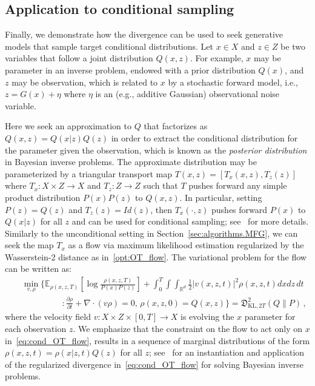 \documentclass{amsart}
\newcommand{\rb}[1]{#1} %
\newcommand{\R}{\mathbb{R}}
\theoremstyle{definition}
\theoremstyle{remark}
\numberwithin{equation}{section}
\begin{document}
\subsection{Application to conditional sampling} \rb{Finally, we demonstrate how the divergence can be used to seek generative models that sample target conditional distributions. Let $x \in X$ and $z \in Z$ be two variables that follow a joint distribution $Q(x,z)$. For example, $x$ may be parameter in an inverse problem, endowed with a prior distribution $Q(x)$, and $z$ may be observation, which is related to $x$ by a stochastic forward model, i.e., $z = G(x) + \eta$ where $\eta$ is an (e.g., additive Gaussian) observational noise variable.}

\rb{Here we seek an approximation to $Q$ that factorizes as $Q(x,z) = Q(x|z)Q(z)$ in order to extract the conditional distribution for the parameter given the observation, which is known as the \emph{posterior distribution} in Bayesian inverse problems. The approximate distribution may be parameterized by a triangular transport map $T(x,z) = [T_x(x,z), T_z(z)]$ where $T_x : X \times Z \rightarrow X$ and $T_z : Z \rightarrow Z$ such that $T$  pushes forward any simple product distribution $P(x)P(z)$ to $Q(x,z)$. In particular, setting $P(z) = Q(z)$ and $T_z(z) = Id(z)$, then $T_x(\cdot,z)$ pushes forward $P(x)$ to $Q(x|z)$ for all $z$ and can be used for conditional sampling; see~\cite{baptista2024conditional} for more details. Similarly to the unconditional setting in Section~\ref{sec:algorithms.MFG}, we can seek the map $T_x$ as a flow via maximum likelihood estimation regularized by the Wasserstein-2 distance as in~\eqref{opt:OT_flow}. The variational problem for the flow can be written as: 
     \begin{eqnarray}\label{eq:cond_OT_flow}
        &&\min_{v,\rho} \Bigg\{\mathbb{E}_{\rho(x,z,T)}\left[\log \frac{\rho(x,z,T)}{P(x)P(z)} \right] + \int_0^T \int \int_{\R^d} \frac{1}{2} |v(x,z,t)|^2 \rho(x,z,t) dx dz \, dt\nonumber\\
        &&\hspace{2cm}:\frac{\partial \rho}{\partial t} + \nabla \cdot (v\rho) = 0,\, \rho(x,z,0) = Q(x,z)\Bigg\} = \mathfrak{D}^2_{\mathrm{KL}, 2T}(Q\|P)\,,
    \end{eqnarray}
where the velocity field $v : X \times Z \times [0,T] \rightarrow X$ is evolving the $x$ parameter for each observation $z$. We emphasize that the constraint on the flow to act only on $x$ in~\eqref{eq:cond_OT_flow}, results in a sequence of marginal distributions of the form $\rho(x,z,t) = \rho(x|z,t)Q(z)$ for all $z$; see~\cite{wang2023efficient} for an instantiation and application of the regularized divergence in~\eqref{eq:cond_OT_flow} for solving Bayesian inverse problems.}
\end{document}
